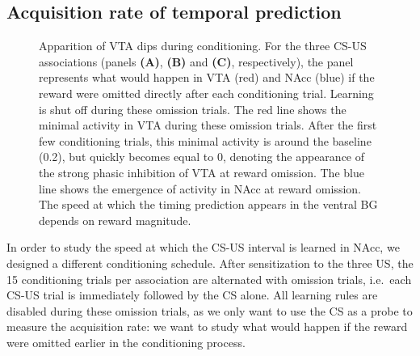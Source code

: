 \documentclass[
  11pt,
  a4paper,
]{scrbook}
\begin{document}
\subsection{Acquisition rate of temporal
prediction}\label{acquisition-rate-of-temporal-prediction}

\begin{figure}


\caption{\label{fig-finr:vta_dips}Apparition of VTA dips during
conditioning. For the three CS-US associations (panels \textbf{(A)},
\textbf{(B)} and \textbf{(C)}, respectively), the panel represents what
would happen in VTA (red) and NAcc (blue) if the reward were omitted
directly after each conditioning trial. Learning is shut off during
these omission trials. The red line shows the minimal activity in VTA
during these omission trials. After the first few conditioning trials,
this minimal activity is around the baseline (0.2), but quickly becomes
equal to 0, denoting the appearance of the strong phasic inhibition of
VTA at reward omission. The blue line shows the emergence of activity in
NAcc at reward omission. The speed at which the timing prediction
appears in the ventral BG depends on reward magnitude.}

\end{figure}%

In order to study the speed at which the CS-US interval is learned in
NAcc, we designed a different conditioning schedule. After sensitization
to the three US, the 15 conditioning trials per association are
alternated with omission trials, i.e.~each CS-US trial is immediately
followed by the CS alone. All learning rules are disabled during these
omission trials, as we only want to use the CS as a probe to measure the
acquisition rate: we want to study what would happen if the reward were
omitted earlier in the conditioning process.
\end{document}
